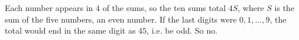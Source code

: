 Each number appears in $4$ of the sums, so the ten sums total $4S$, where $S$ is the sum of the five numbers, an even number. If the last digits were $0,1,\dots,9$, the total would end in the same digit as $45$, i.e. be odd. So $\boxed{\text{no}}$.
